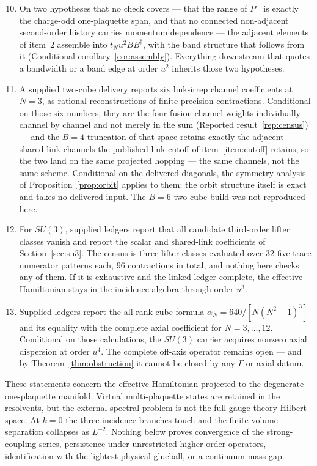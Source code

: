 \documentclass[10pt,twocolumn]{article}
\theoremstyle{plain}
\theoremstyle{definition}
\theoremstyle{remark}
\newcommand{\dg}{^{\dagger}}
\begin{document}
\begin{enumerate}\setcounter{enumi}{9}\itemsep2pt
\item\label{item:assembly} On two hypotheses that no check covers --- that the
  range of $P_-$ is exactly the charge-odd one-plaquette span, and that no
  connected non-adjacent second-order history carries momentum dependence ---
  the adjacent elements of item~2 assemble into $t_Nu^2BB\dg$, with the band
  structure that follows from it (Conditional corollary~\ref{cor:assembly}).
  Everything downstream that quotes a bandwidth or a band edge at order $u^2$
  inherits those two hypotheses.
\item A supplied two-cube delivery reports six link-irrep channel
  coefficients at $N=3$, as rational reconstructions of finite-precision
  contractions. Conditional on those six numbers, they are the four
  fusion-channel weights individually --- channel by channel and not merely in
  the sum (Reported result~\ref{rep:census}) --- and the $B=4$ truncation of
  that space retains exactly the adjacent shared-link channels the published
  link cutoff of item~\ref{item:cutoff} retains, so the two land on the same
  projected hopping --- the same channels, not the same scheme. Conditional on the delivered diagonals, the symmetry
  analysis of Proposition~\ref{prop:orbit} applies to them: the orbit structure
  itself is exact and takes no delivered input.
  The $B=6$ two-cube build was not reproduced here.
\item\label{item:domino} For $SU(3)$, supplied ledgers report that all
  candidate third-order lifter classes vanish and report the scalar and shared-link coefficients of
  Section~\ref{sec:su3}. The census is three lifter classes evaluated over
  $32$ five-trace numerator patterns each, $96$ contractions in total, and
  nothing here checks any of them. If it is exhaustive and the linked ledger
  complete, the effective Hamiltonian stays in the incidence algebra through
  order $u^3$.
\item Supplied ledgers report the all-rank cube formula
  $\alpha_N=640/[N(N^2-1)^3]$ and its equality with the complete axial
  coefficient for $N=3,\dots,12$. Conditional on those calculations, the
  $SU(3)$ carrier acquires nonzero axial dispersion at order $u^4$. The
  complete off-axis operator remains open --- and by
  Theorem~\ref{thm:obstruction} it cannot be closed by any $\Gamma$ or axial
  datum.
\end{enumerate}

These statements concern the effective Hamiltonian projected to the degenerate
one-plaquette manifold. Virtual multi-plaquette states are retained in the
resolvents, but the external spectral problem is not the full gauge-theory
Hilbert space. At $k=0$ the three incidence branches touch and the
finite-volume separation collapses as $L^{-2}$. Nothing below proves
convergence of the strong-coupling series, persistence under unrestricted
higher-order operators, identification with the lightest physical glueball, or
a continuum mass gap.
\end{document}
